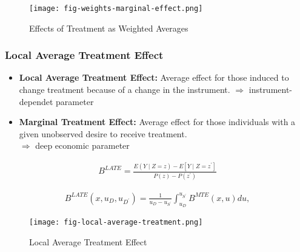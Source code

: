 \begin{frame}

\begin{figure}[htp]\centering
	\caption{Effects of Treatment as Weighted Averages}\label{Effects of Treatment as Weighted Averages}\scalebox{0.35}
	{\texttt{[image: fig-weights-marginal-effect.png]}}
\end{figure}

\end{frame}


\begin{frame}
\frametitle{Local Average Treatment Effect}

\begin{itemize}
\item \textbf{Local Average Treatment Effect:} Average effect for those induced
to change treatment because of a change in the instrument.
\(\Rightarrow\) instrument-dependet parameter

\item \textbf{Marginal Treatment Effect:} Average effect for those individuals
with a given unobserved desire to receive treatment.\\
\(\Rightarrow\) deep economic parameter
\end{itemize}

    \begin{align*}
B^{LATE} = \frac{E(Y\mid Z = z) - E[Y \mid Z = z^\prime]}{P(z) - P(z^\prime)}
\end{align*}

\begin{align*}
B^{LATE}(x, u_D, u_{D^\prime}) = \frac{1}{u_D - u_{S^\prime}} \int_{u_D}^{u_{S^\prime}} B^{MTE}(x, u) du,
\end{align*}

\end{frame}


\begin{frame}

\begin{figure}[htp]\centering
	\caption{Local Average Treatment Effect}\label{Local Average Treatment}\scalebox{0.35}
	{\texttt{[image: fig-local-average-treatment.png]}}
\end{figure}

\end{frame}


